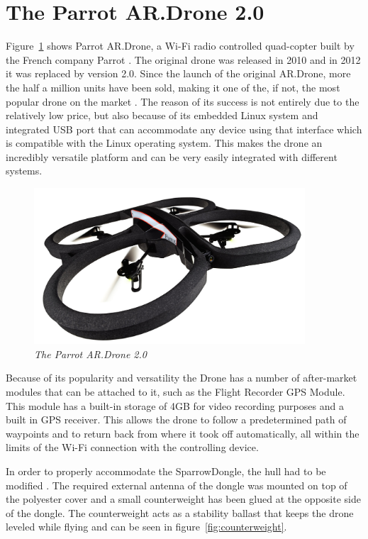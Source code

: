 \section{The Parrot AR.Drone 2.0}

Figure~\ref{fig:drone} shows Parrot AR.Drone, a Wi-Fi radio controlled quad-copter built by the French company Parrot\cite{parrot2012drone} .
The original drone was released in 2010 and in 2012 it was replaced by version 2.0. Since the launch of the original AR.Drone, more the half a million units have been sold, making it one of the, if not, the most popular drone on the market \cite{parrotpopular}. The reason of its success is not entirely due to the relatively low price, but also because of its embedded Linux system and integrated USB port that can accommodate any device using that interface which is compatible with the Linux operating system. This makes the drone an incredibly versatile platform and can be very easily integrated with different systems. 
\begin{figure}[ht]
\begin{center}
\includegraphics[width=0.9\textwidth]{img/drone.jpg}
\end{center}
\caption{\small \itshape{The Parrot AR.Drone 2.0}\cite{parrot_drone}}
  \label{fig:drone}
\end{figure}


Because of its popularity and versatility the Drone has a number of after-market modules that can be attached to it, such as 
the Flight Recorder GPS Module. This module has a built-in storage of 4GB for video recording purposes and a built in GPS receiver. This allows the drone to follow a predetermined path of waypoints and to return back from where it took off automatically, all within the limits of the Wi-Fi connection with the controlling device.

In order to properly accommodate the SparrowDongle, the hull had to be modified . The required external antenna of the dongle was mounted on top of the polyester cover and a small counterweight has been glued at the opposite side of the dongle. The counterweight acts as a stability ballast that keeps the drone leveled while flying and can be seen in figure~\ref{fig:counterweight}.

